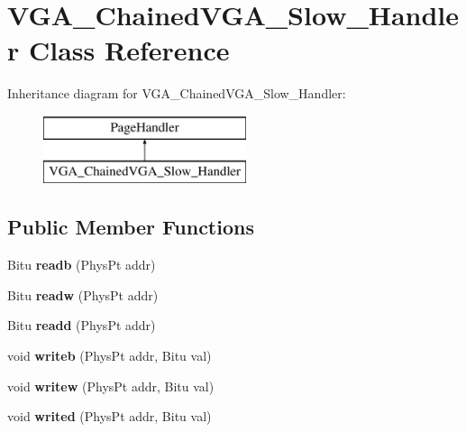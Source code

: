 \hypertarget{classVGA__ChainedVGA__Slow__Handler}{\section{V\-G\-A\-\_\-\-Chained\-V\-G\-A\-\_\-\-Slow\-\_\-\-Handler Class Reference}
\label{classVGA__ChainedVGA__Slow__Handler}
}
Inheritance diagram for V\-G\-A\-\_\-\-Chained\-V\-G\-A\-\_\-\-Slow\-\_\-\-Handler\-:\begin{figure}[H]
\begin{center}
\leavevmode
\includegraphics[height=2.000000cm]{classVGA__ChainedVGA__Slow__Handler}
\end{center}
\end{figure}
\subsection*{Public Member Functions}
\begin{DoxyCompactItemize}
\item 
\hypertarget{classVGA__ChainedVGA__Slow__Handler_a0c3683e3ab5bf6c7ab97b73b73f1aaae}{Bitu {\bfseries readb} (Phys\-Pt addr)}\label{classVGA__ChainedVGA__Slow__Handler_a0c3683e3ab5bf6c7ab97b73b73f1aaae}

\item 
\hypertarget{classVGA__ChainedVGA__Slow__Handler_aadb680f77f971de742107e99434347d2}{Bitu {\bfseries readw} (Phys\-Pt addr)}\label{classVGA__ChainedVGA__Slow__Handler_aadb680f77f971de742107e99434347d2}

\item 
\hypertarget{classVGA__ChainedVGA__Slow__Handler_a5b43792d46b7f601fbaf0680fcb0e4e7}{Bitu {\bfseries readd} (Phys\-Pt addr)}\label{classVGA__ChainedVGA__Slow__Handler_a5b43792d46b7f601fbaf0680fcb0e4e7}

\item 
\hypertarget{classVGA__ChainedVGA__Slow__Handler_a398c6b7f09ad8a9fb0e4c6cb60dfed8e}{void {\bfseries writeb} (Phys\-Pt addr, Bitu val)}\label{classVGA__ChainedVGA__Slow__Handler_a398c6b7f09ad8a9fb0e4c6cb60dfed8e}

\item 
\hypertarget{classVGA__ChainedVGA__Slow__Handler_ac1387b24edc0d41bdc96a939d3c15917}{void {\bfseries writew} (Phys\-Pt addr, Bitu val)}\label{classVGA__ChainedVGA__Slow__Handler_ac1387b24edc0d41bdc96a939d3c15917}

\item 
\hypertarget{classVGA__ChainedVGA__Slow__Handler_af81e472fcf33126d77905180f87cbc69}{void {\bfseries writed} (Phys\-Pt addr, Bitu val)}\label{classVGA__ChainedVGA__Slow__Handler_af81e472fcf33126d77905180f87cbc69}

\end{DoxyCompactItemize}
